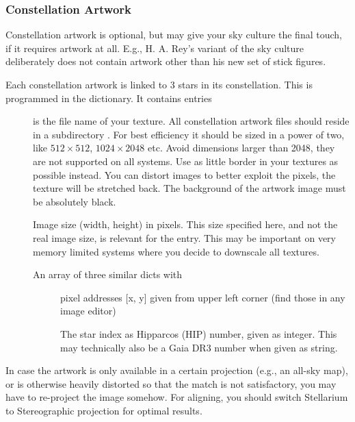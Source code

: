 \subsubsection{Constellation Artwork}
\label{sec:skycultures:artwork}
\label{SC:image}

Constellation artwork is optional, but may give your sky culture the
final touch, if it requires artwork at all. E.g., H. A. Rey's variant
of the  sky culture deliberately does not contain artwork
other than his new set of stick figures.

Each constellation artwork is linked to 3 stars in its constellation. This
is programmed in the  dictionary. It contains entries
\begin{description}
\item[] is the file name of your texture. All constellation artwork files should reside in a subdirectory . 
  For best efficiency it should be
  sized in a power of two, like $512\times512$, $1024\times2048$
  etc. Avoid dimensions larger than 2048, they are not supported on
  all systems. Use as little border in your textures as possible instead.
  You can distort images to better exploit the pixels,
  the texture will be stretched back. The background of the artwork
  image must be absolutely black.
  \item[] Image size (width, height) in pixels. This size specified here, and not the real image size, is relevant for the  entry. 
  This may be important on very memory limited systems where you decide to downscale all textures.
  \item[] An array of three similar dicts with
  \begin{description}
  \item[] pixel addresses [x, y] given from upper left corner (find those in any image editor)
  \item[] The star index as Hipparcos (HIP) number, given as integer. This may technically also be a Gaia DR3 number when given as string.
  \end{description}
\end{description}
%
In case the artwork is only available in a certain projection (e.g.,
an all-sky map), or is otherwise heavily distorted so that the match
is not satisfactory, you may have to re-project the image somehow. For
aligning, you should switch Stellarium to Stereographic projection for
optimal results.

